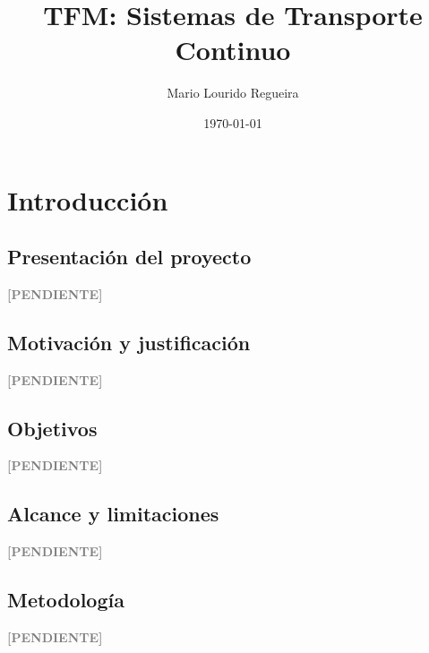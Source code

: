 \documentclass[12pt,a4paper]{article}
\title{TFM: Sistemas de Transporte Continuo}
\author{Mario Lourido Regueira}
\date{\today}
\newenvironment{pendiente}
  {\par\vspace{4pt}\noindent\textcolor{gray}{\textbf{[PENDIENTE]}}\par\begingroup\color{gray}\small}
  {\endgroup\par\vspace{4pt}}
\begin{document}
\maketitle




\section{Introducción}

\subsection{Presentación del proyecto}
\begin{pendiente}
\end{pendiente}

\subsection{Motivación y justificación}
\begin{pendiente}
\end{pendiente}

\subsection{Objetivos}
\begin{pendiente}
\end{pendiente}

\subsection{Alcance y limitaciones}
\begin{pendiente}
\end{pendiente}

\subsection{Metodología}
\begin{pendiente}
\end{pendiente}
\end{document}
